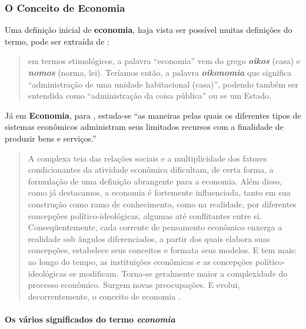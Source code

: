 \documentclass[]{article}
\let\oldparagraph\paragraph
\renewcommand{\paragraph}[1]{\oldparagraph{#1}\mbox{}}
\begin{document}
\subsubsection{O Conceito de Economia}\label{o-conceito-de-economia}

Uma definição inicial de \textbf{economia}, haja vista ser possível
muitas definições do termo, pode ser extraída de
:

\begin{quote}
em termos etimológicos, a palavra ``economia'' vem do grego
\textbf{\emph{oikos}} (casa) e \textbf{\emph{nomos}} (norma, lei).
Teríamos então, a palavra \textbf{\emph{oikonomia}} que significa
``administração de uma unidade habitacional (casa)'', podendo também ser
entendida como ``administração da coisa pública'' ou se um Estado.
\end{quote}

Já em \textbf{Economia}, para , estuda-se
``as maneiras pelas quais os diferentes tipos de sistemas econômicos
administram seus limitados recursos com a finalidade de produzir bens e
serviços.''

\begin{quote}
A complexa teia das relações sociais e a multiplicidade dos fatores
condicionantes da atividade econômica dificultam, de certa forma, a
formulação de uma definição abrangente para a economia. Além disso, como
já destacamos, a economia é fortemente influenciada, tanto em sua
construção como ramo de conhecimento, como na realidade, por diferentes
concepções político-ideológicas, algumas até conflitantes entre si.
Conseqüentemente, cada corrente de pensamento econômico enxerga a
realidade sob ângulos diferenciados, a partir dos quais elabora suas
concepções, estabelece seus conceitos e formata seus modelos. E tem
mais: ao longo do tempo, as instituições econômicas e as concepções
político-ideológicas se modificam. Torna-se geralmente maior a
complexidade do processo econômico. Surgem novas preocupações. E evolui,
decorrentemente, o conceito de economia \cite[p.~43-46]{rossetti}.
\end{quote}

\paragraph{\texorpdfstring{Os vários significados do termo
\emph{economia}}{Os vários significados do termo economia}}\label{os-varios-significados-do-termo-economia}
\end{document}
